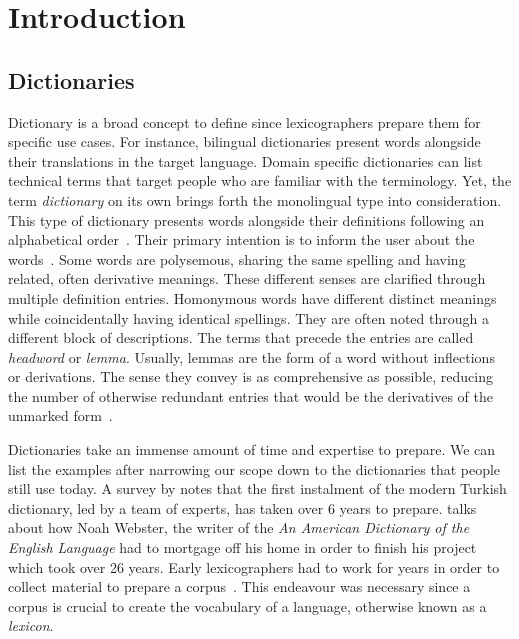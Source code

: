 \chapter{Introduction}\label{chap:introduction}%
\section{Dictionaries}%
\label{sec:dictionaries}
Dictionary is a broad concept to define since lexicographers prepare them for specific use cases.
For instance, bilingual dictionaries present words alongside their translations in the target language.
Domain specific dictionaries can list technical terms that target people who are familiar with the terminology.
Yet, the term \emph{dictionary} on its own brings forth the monolingual type into consideration.
This type of dictionary presents words alongside their definitions following an alphabetical order~\cite{sterkenburg_practical_2003}.
Their primary intention is to inform the user about the words~\cite{uzun_modern_2005}.
Some words are polysemous, sharing the same spelling and having related, often derivative meanings.
These different senses are clarified through multiple definition entries.
Homonymous words have different distinct meanings while coincidentally having identical spellings.
They are often noted through a different block of descriptions.
The terms that precede the entries are called \emph{headword} or \emph{lemma}.
Usually, lemmas are the form of a word without inflections or derivations.
The sense they convey is as comprehensive as possible, reducing the number of otherwise redundant entries that would be the derivatives of the unmarked form~\cite{ibrahim_usta_turkce_2006}.

Dictionaries take an immense amount of time and expertise to prepare.
We can list the examples after narrowing our scope down to the dictionaries that people still use today.
A survey by \textcite{uzun_1945ten_1999} notes that the first instalment of the modern Turkish dictionary, led by a team of experts, has taken over 6 years to prepare.
\textcite{kendall_forgotten_2011} talks about how Noah Webster, the writer of the \emph{An American Dictionary of the English Language} had to mortgage off his home in order to finish his project which took over 26 years.
Early lexicographers had to work for years in order to collect material to prepare a corpus~\cite{uzun_1945ten_1999}.
This endeavour was necessary since a corpus is crucial to create the vocabulary of a language, otherwise known as a \emph{lexicon}.

